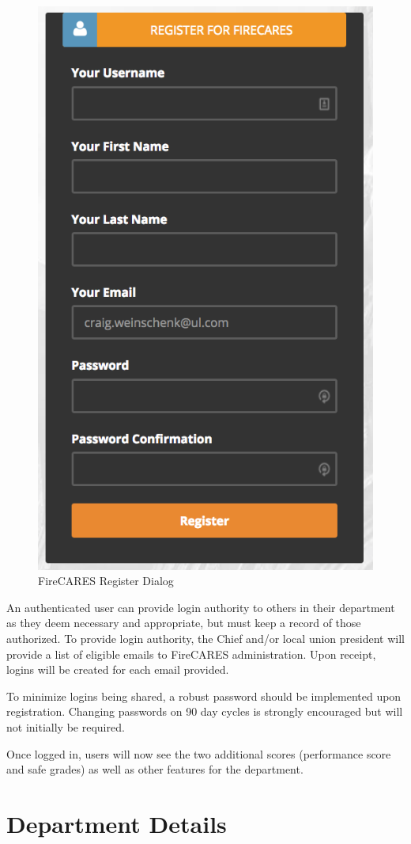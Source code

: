 \documentclass[12pt,oneside]{book}
\begin{document}
\begin{figure}[ht!]
\centering
\includegraphics[width=.5\columnwidth]{Figures/login2}
\caption{FireCARES Register Dialog}
\label{fig:login2}
\end{figure}

An authenticated user can provide login authority to others in their department as they deem necessary and appropriate, but must keep a record of those authorized. To provide login authority, the Chief and/or local union president will provide a list of eligible emails to FireCARES administration.  Upon receipt, logins will be created for each email provided.

To minimize logins being shared, a robust password should be implemented upon registration. Changing passwords on 90 day cycles is strongly encouraged but will not initially be required.

Once logged in, users will now see the two additional scores (performance score and safe grades) as well as other features for the department.  

\FloatBarrier

\section{Department Details}
\end{document}
